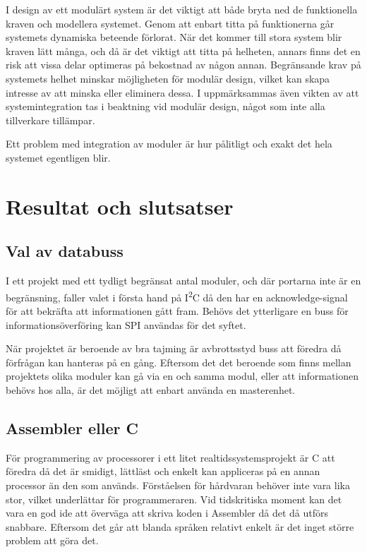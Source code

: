 \documentclass[11pt]{article}
\begin{document}
\begin{flushleft}
I design av ett modulärt system är det viktigt att både bryta ned de funktionella kraven och modellera systemet. Genom att enbart titta på funktionerna går systemets dynamiska beteende förlorat. När det kommer till stora system blir kraven lätt många, och då är det viktigt att titta på helheten, annars finns det en risk att vissa delar optimeras på bekostnad av någon annan. Begränsande krav på systemets helhet minskar möjligheten för modulär design, vilket kan skapa intresse av att minska eller eliminera dessa. \cite{Modules} I \cite{MMPD} uppmärksammas även vikten av att systemintegration tas i beaktning vid modulär design, något som inte alla tillverkare tillämpar. 

Ett problem med integration av moduler är hur pålitligt och exakt det hela systemet egentligen blir. \cite{DIMRS}

\pagebreak

\section{Resultat och slutsatser}

\subsection{Val av databuss}
I ett projekt med ett tydligt begränsat antal moduler, och där portarna inte är en begränsning, faller valet i första hand på I\textsuperscript{2}C då den har en acknowledge-signal för att bekräfta att informationen gått fram. Behövs det ytterligare en buss för informationsöverföring kan SPI användas för det syftet.

När projektet är beroende av bra tajming är avbrottsstyd buss att föredra då förfrågan kan hanteras på en gång. Eftersom det det beroende som finns mellan projektets olika moduler kan gå via en och samma modul, eller att informationen behövs hos alla, är det möjligt att enbart använda en masterenhet.

\subsection{Assembler eller C}

För programmering av processorer i ett litet realtidssystemsprojekt är C att föredra då det är smidigt, lättläst och enkelt kan appliceras på en annan processor än den som används. Förståelsen för hårdvaran behöver inte vara lika stor, vilket underlättar för programmeraren. Vid tidskritiska moment kan det vara en god ide att överväga att skriva koden i Assembler då det då utförs snabbare. Eftersom det går att blanda språken relativt enkelt är det inget större problem att göra det.


\end{flushleft}
\end{document}
